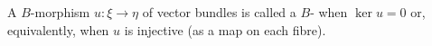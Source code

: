 A $B$-morphism $u: \xi \rightarrow \eta$ of vector bundles is called a $B$- when $\ker u = 0$ or, equivalently, when $u$ is injective (as a map on each fibre).
